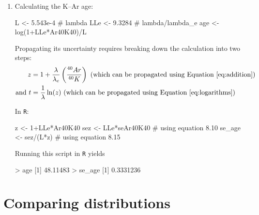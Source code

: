 \begin{enumerate}
\begin{enumerate}
\item Calculating the K--Ar age:

\begin{script}[firstnumber=11]
L <- 5.543e-4 # lambda
LLe <- 9.3284 # lambda/lambda_e
age <- log(1+LLe*Ar40K40)/L
\end{script}

Propagating its uncertainty requires breaking down the calculation
into two steps:
\[
\begin{split}
  z & = 1 + \frac{\lambda}{\lambda_e}\left(\frac{^{40}Ar }{^{40}K}\right)
    \mbox{~(which can be propagated using Equation~\ref{eq:addition})}\\
  \mbox{and~}t & = \frac{1}{\lambda}\ln(z) 
  \mbox{~(which can be propagated using Equation~\ref{eq:logarithms})}
\end{split}
\]

In \texttt{R}:

\begin{script}[firstnumber=14]
z <- 1+LLe*Ar40K40
sez <- LLe*seAr40K40 # using equation 8.10
se_age <- sez/(L*z)  # using equation 8.15
\end{script}

Running this script in \texttt{R} yields

\begin{console}
> age
[1] 48.11483
> se_age
[1] 0.3331236
\end{console}
  
\end{enumerate}

\end{enumerate}
  
\section{Comparing distributions}
\label{sec:sol-comparingdistributions}

